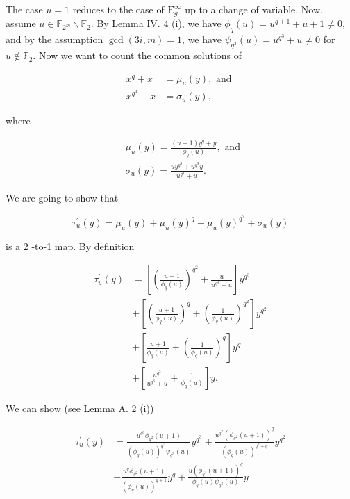 \documentclass[10pt]{article}
\begin{document}
The case $u=1$ reduces to the case of $\mathrm{E}_{g}^{\infty}$ up to a change of variable. Now, assume $u \in \mathbb{F}_{2^{m}} \backslash \mathbb{F}_{2}$. By Lemma IV. 4 (i), we have $\phi_{q}(u)=u^{q+1}+u+1 \neq 0$, and by the assumption $\operatorname{gcd}(3 i, m)=1$, we have $\psi_{q^{3}}(u)=u^{q^{3}}+u \neq 0$ for $u \notin \mathbb{F}_{2}$. Now we want to count the common solutions of


\begin{align*}
x^{q}+x & =\mu_{u}(y), \text { and }  \tag{12}\\
x^{q^{3}}+x & =\sigma_{u}(y), \tag{13}
\end{align*}


where

$$
\begin{aligned}
& \mu_{u}(y)=\frac{(u+1) y^{q}+y}{\phi_{q}(u)}, \text { and } \\
& \sigma_{u}(y)=\frac{u y^{q^{3}}+u^{q^{3}} y}{u^{q^{3}}+u} .
\end{aligned}
$$

We are going to show that

$$
\tau_{u}^{\prime}(y)=\mu_{u}(y)+\mu_{u}(y)^{q}+\mu_{u}(y)^{q^{2}}+\sigma_{u}(y)
$$

is a 2 -to-1 map. By definition


\begin{align*}
\tau_{u}^{\prime}(y) & =\left[\left(\frac{u+1}{\phi_{q}(u)}\right)^{q^{2}}+\frac{u}{u^{q^{3}}+u}\right] y^{q^{3}} \\
& +\left[\left(\frac{u+1}{\phi_{q}(u)}\right)^{q}+\left(\frac{1}{\phi_{q}(u)}\right)^{q^{2}}\right] y^{q^{2}} \\
& +\left[\frac{u+1}{\phi_{q}(u)}+\left(\frac{1}{\phi_{q}(u)}\right)^{q}\right] y^{q} \\
& +\left[\frac{u^{q^{3}}}{u^{q^{3}}+u}+\frac{1}{\phi_{q}(u)}\right] y . \tag{14}
\end{align*}


We can show (see Lemma A. 2 (i))

$$
\begin{aligned}
\tau_{u}^{\prime}(y) & =\frac{u^{q^{3}} \phi_{q^{2}}(u+1)}{\left(\phi_{q}(u)\right)^{q^{2}} \psi_{q^{3}}(u)} y^{q^{3}}+\frac{u^{q^{2}}\left(\phi_{q^{2}}(u+1)\right)^{q}}{\left(\phi_{q}(u)\right)^{q^{2}+q}} y^{q^{2}} \\
& +\frac{u^{q} \phi_{q^{2}}(u+1)}{\left(\phi_{q}(u)\right)^{q+1}} y^{q}+\frac{u\left(\phi_{q^{2}}(u+1)\right)^{q}}{\phi_{q}(u) \psi_{q^{3}}(u)} y
\end{aligned}
$$
\end{document}
